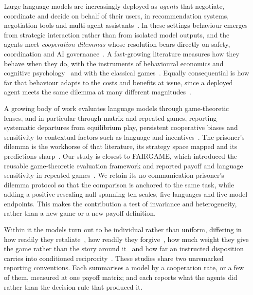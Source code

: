 \documentclass[11pt,a4paper]{article}
\begin{document}
Large language models are increasingly deployed as \emph{agents} that
negotiate, coordinate and decide on behalf of their users, in recommendation
systems, negotiation tools and multi-agent
assistants~\cite{park2023generative,tessler2024ai,hammond2025multi,cook2024llm}.
In these settings behaviour emerges from strategic interaction rather than from
isolated model outputs, and the agents meet \emph{cooperation dilemmas} whose
resolution bears directly on safety, coordination and AI
governance~\cite{dafoe2021cooperative,lu2024llms,han2026social,idowu2026mapping}.
A fast-growing literature measures how they behave when they do, with the
instruments of behavioural economics and cognitive
psychology~\cite{binz2023using,horton2023large,aher2023using} and with the
classical games~\cite{mei2024turing}. Equally consequential is how far that
behaviour adapts to the costs and benefits at issue, since a deployed agent
meets the same dilemma at many different magnitudes~\cite{hammond2025multi}.

A growing body of work evaluates language models through game-theoretic
lenses, and in particular through matrix and repeated games, reporting
systematic departures from equilibrium play, persistent cooperative biases and
sensitivity to contextual factors such as language and
incentives~\cite{buscemi2025fairgame,sun2025gtllm_survey,mao2025alympics,pal2026strategiescooperationdefectionlarge,willis2025will,fan2024can,pires2025large,fu2026optimal}.
The prisoner's dilemma is the workhorse of that literature, its strategy space
mapped and its predictions
sharp~\cite{axelrod1981evolution,axelrod1984evolution,nowak1992tit,nowak1993strategy,nowak2006five,pressDyson2012}.
Our study is closest to FAIRGAME, which introduced the reusable game-theoretic
evaluation framework and reported payoff and language sensitivity in repeated
games~\cite{buscemi2025fairgame}. We retain its no-communication prisoner's
dilemma protocol so that the comparison is anchored to the same task, while
adding a positive-rescaling null spanning ten scales, five languages and five
model endpoints. This makes the
contribution a test of invariance and heterogeneity, rather than a new game or
a new payoff definition.

Within it the models turn out to be individual rather than uniform, differing
in how readily they retaliate~\cite{akata2025}, how readily they
forgive~\cite{fontana2025nicer}, how much weight they give the game rather than
the story around it~\cite{loreheydari2024strategic} and how far an instructed
disposition carries into conditioned
reciprocity~\cite{phelps2023investigating}. These studies share two unremarked
reporting conventions. Each summarises a model by a cooperation rate, or a few
of them, measured at one payoff matrix; and each reports what the agents did
rather than the decision rule that produced it.
\end{document}
